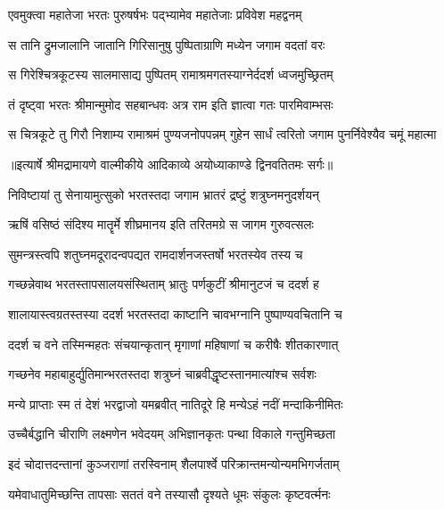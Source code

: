 \twolineshloka
{एवमुक्त्वा महातेजा भरतः पुरुषर्षभः}
{पद्भ्यामेव महातेजाः प्रविवेश महद्वनम्} %

\twolineshloka
{स तानि द्रुमजालानि जातानि गिरिसानुषु}
{पुष्पिताग्राणि मध्येन जगाम वदतां वरः} %

\twolineshloka
{स गिरेश्चित्रकूटस्य सालमासाद्य पुष्पितम्}
{रामाश्रमगतस्याग्नेर्ददर्श ध्वजमुच्छ्रितम्} %

\twolineshloka
{तं दृष्ट्वा भरतः श्रीमान्मुमोद सहबान्धवः}
{अत्र राम इति ज्ञात्वा गतः पारमिवाम्भसः} %

\fourlineindentedshloka
{स चित्रकूटे तु गिरौ निशाम्य}
{ रामाश्रमं पुण्यजनोपपन्नम्}
{गुहेन सार्धं त्वरितो जगाम}
{ पुनर्निवेश्यैव चमूं महात्मा} %


{॥इत्यार्षे श्रीमद्रामायणे वाल्मीकीये आदिकाव्ये अयोध्याकाण्डे द्विनवतितमः सर्गः॥}


\twolineshloka
{निविष्टायां तु सेनायामुत्सुको भरतस्तदा}
{जगाम भ्रातरं द्रष्टुं शत्रुघ्नमनुदर्शयन्} %

\twolineshloka
{ऋषिं वसिष्ठं संदिश्य मातॄर्मे शीघ्रमानय}
{इति तरितमग्रे स जागम गुरुवत्सलः} %

\twolineshloka
{सुमन्त्रस्त्वपि शतुघ्नमदूरादन्वपद्यत}
{रामदार्शनजस्तर्षो भरतस्येव तस्य च} %

\twolineshloka
{गच्छन्नेवाथ भरतस्तापसालयसंस्थिताम्}
{भ्रातुः पर्णकुटीं श्रीमानुटजं च ददर्श ह} %

\twolineshloka
{शालायास्त्वग्रतस्तस्या ददर्श भरतस्तदा}
{काष्टानि चावभग्नानि पुष्पाण्यवचितानि च} %

\twolineshloka
{ददर्श च वने तस्मिन्महतः संचयान्कृतान्}
{मृगाणां महिषाणां च करीषैः शीतकारणात्} %

\twolineshloka
{गच्छनेव महाबाहुर्द्युतिमान्भरतस्तदा}
{शत्रुघ्नं चाब्रवीद्धृष्टस्तानमात्यांश्च सर्वशः} %

\twolineshloka
{मन्ये प्राप्ताः स्म तं देशं भरद्वाजो यमब्रवीत्}
{नातिदूरे हि मन्येऽहं नदीं मन्दाकिनीमितः} %

\twolineshloka
{उच्चैर्बद्धानि चीराणि लक्ष्मणेन भवेदयम्}
{अभिज्ञानकृतः पन्था विकाले गन्तुमिच्छता} %

\twolineshloka
{इदं चोदात्तदन्तानां कुञ्जराणां तरस्विनाम्}
{शैलपार्श्वे परिक्रान्तमन्योन्यमभिगर्जताम्} %

\twolineshloka
{यमेवाधातुमिच्छन्ति तापसाः सततं वने}
{तस्यासौ दृश्यते धूमः संकुलः कृष्टवर्त्मनः} %

